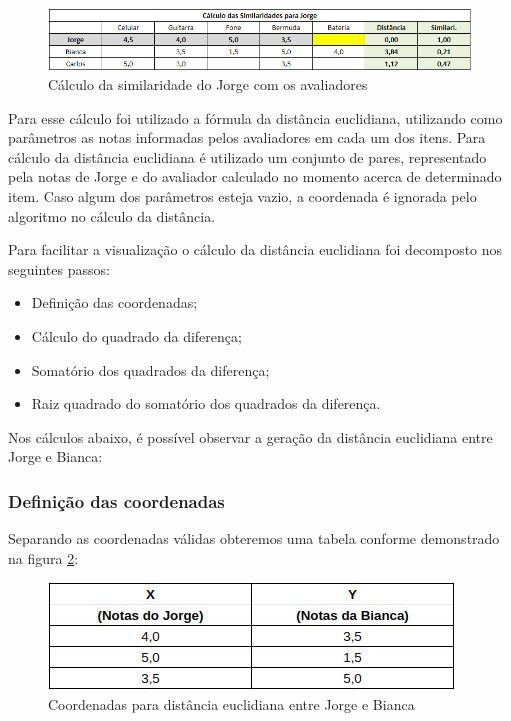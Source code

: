 \begin{figure}[H]
	\centering
	\includegraphics[width=1\linewidth]{imagens/similaridadeJorge.png}
	\caption[Cálculo da similaridade do Jorge com os avaliadores]{Cálculo da similaridade do Jorge com os avaliadores}
    \label{fig:similaridadeJorge}
\end{figure}

Para esse cálculo foi utilizado a fórmula da distância euclidiana, utilizando como parâmetros as notas informadas pelos avaliadores em cada um dos itens. Para cálculo da distância euclidiana é utilizado um conjunto de pares, representado pela notas de Jorge e do avaliador calculado no momento acerca de determinado item. Caso algum dos parâmetros esteja vazio, a coordenada é ignorada pelo algoritmo no cálculo da distância.

Para facilitar a visualização o cálculo da distância euclidiana foi decomposto nos seguintes passos:

\begin{itemize}
    \item Definição das coordenadas;
    \item Cálculo do quadrado da diferença;
    \item Somatório dos quadrados da diferença;
    \item Raiz quadrado do somatório dos quadrados da diferença.
\end{itemize}

Nos cálculos abaixo, é possível observar a geração da distância euclidiana entre Jorge e Bianca:

\subsubsection{Definição das coordenadas}

Separando as coordenadas válidas obteremos uma tabela conforme demonstrado na figura \ref{fig:coordenadasEuclidiana}:

\begin{figure}[H]
	\centering
	\includegraphics[width=.7\linewidth]{imagens/coordenadasEuclidiana.jpg}
	\caption[Coordenadas para distância euclidiana]{Coordenadas para distância euclidiana entre Jorge e Bianca}
    \label{fig:coordenadasEuclidiana}
\end{figure}

